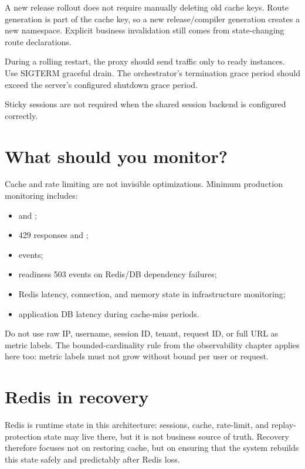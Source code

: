 A new release rollout does not require manually deleting old cache keys. Route generation is part of the cache key, so a new release/compiler generation creates a new namespace. Explicit business invalidation still comes from state-changing route declarations.

During a rolling restart, the proxy should send traffic only to ready instances. Use SIGTERM graceful drain. The orchestrator's termination grace period should exceed the server's configured shutdown grace period.

Sticky sessions are not required when the shared session backend is configured correctly.

\section{What should you monitor?}

Cache and rate limiting are not invisible optimizations. Minimum production monitoring includes:

\begin{itemize}
  \item {} and ;
  \item 429 responses and ;
  \item {} events;
  \item readiness 503 events on Redis/DB dependency failures;
  \item Redis latency, connection, and memory state in infrastructure monitoring;
  \item application DB latency during cache-miss periods.
\end{itemize}

Do not use raw IP, username, session ID, tenant, request ID, or full URL as metric labels. The bounded-cardinality rule from the observability chapter applies here too: metric labels must not grow without bound per user or request.

\section{Redis in recovery}

Redis is runtime state in this architecture: sessions, cache, rate-limit, and replay-protection state may live there, but it is not business source of truth. Recovery therefore focuses not on restoring cache, but on ensuring that the system rebuilds this state safely and predictably after Redis loss.

